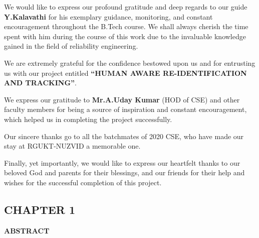 \documentclass{report}
\begin{document}
\noindent
\normalsize{We would like to express our profound gratitude and deep regards to our guide \textbf{Y.Kalavathi}\vspace{3pt} for his exemplary guidance, monitoring, and constant encouragement throughout the B.Tech course.\vspace{3pt} We shall always cherish the time spent with him during the course of this work due to the invaluable\vspace{3pt} knowledge gained in the field of reliability engineering.

We are extremely grateful for the confidence bestowed upon us and for entrusting us with our project\vspace{3pt} entitled \textbf{``HUMAN AWARE RE-IDENTIFICATION AND TRACKING''}.

We express our gratitude to \textbf{Mr.A.Uday Kumar} (HOD of CSE) and other faculty members for\vspace{3pt} being a source of inspiration and constant encouragement, which helped us in completing the project\vspace{3pt} successfully.

Our sincere thanks go to all the batchmates of 2020 CSE, who have made our stay at RGUKT-NUZVID\vspace{3pt} a memorable one.

Finally, yet importantly, we would like to express our heartfelt thanks to our beloved God and parents\vspace{3pt} for their blessings, and our friends for their help and wishes for the successful completion of this project.}

\newpage
\begin{center}
    \section*{\textbf{CHAPTER 1}}
\end{center}
\begin{center}
    \textbf{\Large ABSTRACT}\\[20pt]
\end{center}
\end{document}
